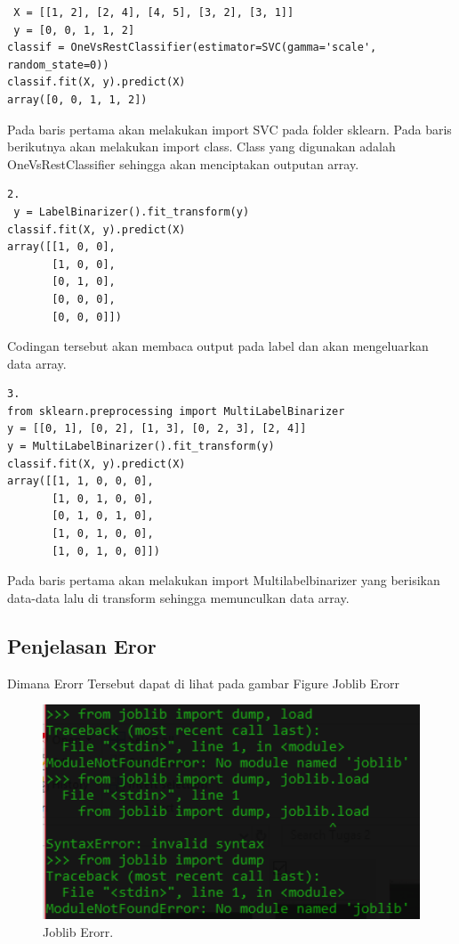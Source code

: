 \begin{enumerate}
\begin{verbatim}
 X = [[1, 2], [2, 4], [4, 5], [3, 2], [3, 1]]
 y = [0, 0, 1, 1, 2]
classif = OneVsRestClassifier(estimator=SVC(gamma='scale', random_state=0))
classif.fit(X, y).predict(X)
array([0, 0, 1, 1, 2])
\end{verbatim}
\subitem
Pada baris pertama akan melakukan import SVC pada folder sklearn.
Pada baris berikutnya akan melakukan import class.
Class yang digunakan adalah OneVsRestClassifier sehingga akan menciptakan outputan array.
\begin{verbatim}
2.
 y = LabelBinarizer().fit_transform(y)
classif.fit(X, y).predict(X)
array([[1, 0, 0],
       [1, 0, 0],
       [0, 1, 0],
       [0, 0, 0],
       [0, 0, 0]])
\end{verbatim}
\subitem
Codingan tersebut akan membaca output pada label dan akan mengeluarkan data array.
\begin{verbatim}
3.
from sklearn.preprocessing import MultiLabelBinarizer
y = [[0, 1], [0, 2], [1, 3], [0, 2, 3], [2, 4]]
y = MultiLabelBinarizer().fit_transform(y)
classif.fit(X, y).predict(X)
array([[1, 1, 0, 0, 0],
       [1, 0, 1, 0, 0],
       [0, 1, 0, 1, 0],
       [1, 0, 1, 0, 0],
       [1, 0, 1, 0, 0]])
\end{verbatim}
\subitem
Pada baris pertama akan melakukan import Multilabelbinarizer yang berisikan data-data lalu di transform sehingga memunculkan data array.

\subsection{Penjelasan Eror}
\subitem
Dimana Erorr Tersebut dapat di lihat pada gambar Figure Joblib Erorr

\begin{figure}[ht]
\centerline{\includegraphics[width=1\textwidth]{figures/Joblib Erorr Y.PNG}}
\caption{Joblib Erorr.}
\end{figure}


\end{enumerate}
